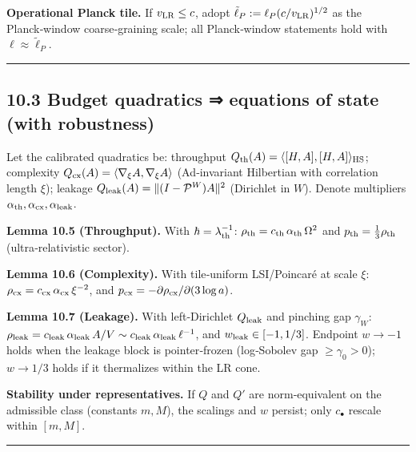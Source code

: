 \documentclass[
]{article}
\numberwithin{equation}{section}
\begin{document}
\textbf{Operational Planck tile.} If \(v_{\rm LR}\le c\), adopt
\(\tilde\ell_P:=\ell_P (c/v_{\rm LR})^{1/2}\) as the Planck‑window
coarse‑graining scale; all Planck‑window statements hold with
\(\ell\approx\tilde\ell_P\).

\begin{center}\rule{0.5\linewidth}{0.5pt}\end{center}

\hypertarget{budget-quadratics-equations-of-state-with-robustness}{%
\subsection{10.3 Budget quadratics ⇒ equations of state (with
robustness)}\label{budget-quadratics-equations-of-state-with-robustness}}

Let the calibrated quadratics be: throughput
\(Q_{\rm th}(A)=\langle[H,A],[H,A]\rangle_{\rm HS}\); complexity
\(Q_{\rm cx}(A)=\langle\nabla_\xi A,\nabla_\xi A\rangle\) (Ad‑invariant
Hilbertian with correlation length \(\xi\)); leakage
\(Q_{\rm leak}(A)=\|(I-\mathcal P^W)A\|^2\) (Dirichlet in \(W\)). Denote
multipliers \(\alpha_{\rm th},\alpha_{\rm cx},\alpha_{\rm leak}\).

\textbf{Lemma 10.5 (Throughput).} With \(\hbar=\lambda_{\rm th}^{-1}\):
\(\rho_{\rm th}=c_{\rm th}\,\alpha_{\rm th}\,\Omega^2\) and
\(p_{\rm th}=\tfrac13\rho_{\rm th}\) (ultra‑relativistic sector).

\textbf{Lemma 10.6 (Complexity).} With tile‑uniform LSI/Poincaré at
scale \(\xi\): \(\rho_{\rm cx}=c_{\rm cx}\,\alpha_{\rm cx}\,\xi^{-2}\),
and \(p_{\rm cx}=-\partial\rho_{\rm cx}/\partial (3\log a)\).

\textbf{Lemma 10.7 (Leakage).} With left‑Dirichlet \(Q_{\rm leak}\) and
pinching gap \(\gamma_W\):
\(\rho_{\rm leak}=c_{\rm leak}\,\alpha_{\rm leak}\,A/V\sim c_{\rm leak}\,\alpha_{\rm leak}\,\ell^{-1}\),
and \(w_{\rm leak}\in[-1,1/3]\). Endpoint \(w\to-1\) holds when the
leakage block is pointer‑frozen (log‑Sobolev gap \(\ge\gamma_0>0\));
\(w\to1/3\) holds if it thermalizes within the LR cone.

\textbf{Stability under representatives.} If \(Q\) and \(Q'\) are
norm‑equivalent on the admissible class (constants \(m,M\)), the
scalings and \(w\) persist; only \(c_\bullet\) rescale within \([m,M]\).

\begin{center}\rule{0.5\linewidth}{0.5pt}\end{center}
\end{document}
